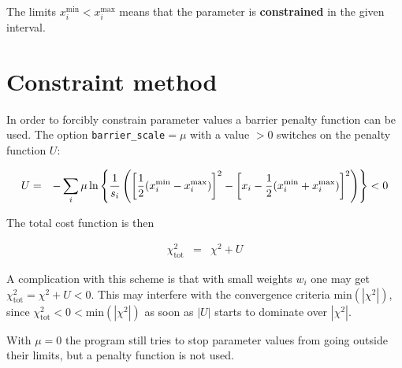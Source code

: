 \documentclass[a4paper,12pt,pdftex,onecolumn]{article}
\begin{document}
The limits $x_i^{\mathrm{min}} < x_i^{\mathrm{max}}$
means that the parameter is \textbf{constrained} in the given interval.



\section{Constraint method}

In order to forcibly constrain parameter values a barrier penalty function can be used.
The option \verb+barrier_scale+$=\mu$ with a value $>0$ switches on the penalty
function $U$:

\begin{eqnarray}
U &=& - \sum_i \mu \ln \left\{
{1 \over s_i} \left(
\left[ {1 \over 2}(x_i^{\mathrm{min}}-x_i^{\mathrm{max}}) \right]^2
- \left[ x_i - {1\over 2}(x_i^{\mathrm{min}} + x_i^{\mathrm{max}}) \right]^2
\right)
\right\}
< 0
\end{eqnarray}

The total cost function is then

\begin{eqnarray}
\chi^2_{\mathrm{tot}} &=& \chi^2 + U
\end{eqnarray}

A complication with this scheme is that with small weights $w_i$ one may
get $\chi^2_{\mathrm{tot}} = \chi^2 + U < 0$. This may interfere with the convergence
criteria $\mathrm{min}(|\chi^2|)$, since $\chi^2_{\mathrm{tot}} < 0 < \mathrm{min}(|\chi^2|)$
as soon as $|U|$ starts to dominate over $|\chi^2|$.

With $\mu=0$ the program still tries to stop parameter values from going outside their
limits, but a penalty function is not used.








\end{document}
